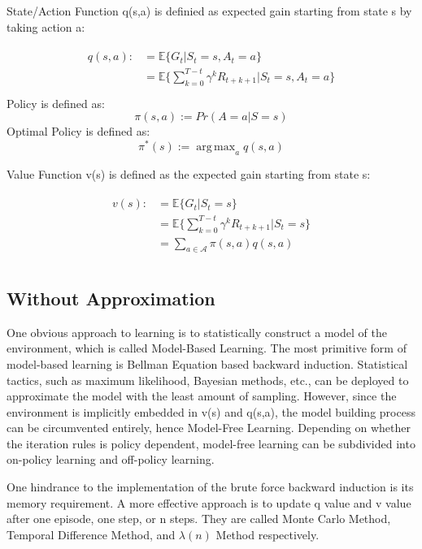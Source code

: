 \documentclass[journal]{IEEEtran}
\DeclareMathOperator*{\argmax}{arg\,max}  %
\begin{document}
State/Action Function q(s,a) is definied as expected gain starting from state s by taking action a:

\begin{align}
\begin{split}
    q(s,a) :&= \mathbb{E}\{G_t|S_t=s,A_t=a\}\\
    &=\mathbb{E} \{\sum_{k=0}^{T-t} \gamma ^k R_{t+k+1}| S_t=s,A_t=a\}\\
\end{split}
\end{align}
Policy is defined as:
\begin{equation}
    \pi(s,a):=Pr(A=a|S=s)
\end{equation}
Optimal Policy is defined as:
\begin{equation}
    \pi^*(s):=\argmax_a q(s,a)
\end{equation}


Value Function v(s) is defined as the expected gain starting from state s:

\begin{align}
\begin{split}
    v(s) :&=  \mathbb{E}\{G_t|S_t=s\}\\
    &=\mathbb{E} \{\sum_{k=0}^{T-t} \gamma ^k R_{t+k+1}| S_t=s\}\\
    &=\sum_{a \in \mathcal{A}} \pi(s,a) q(s,a)\\
\end{split}
\end{align}

\subsection{Without Approximation}
One obvious approach to learning is to statistically construct a model of the environment, which is called Model-Based Learning. The most primitive form of model-based learning is Bellman Equation based backward induction. Statistical tactics, such as maximum likelihood, Bayesian methods, etc., can be deployed to approximate the model with the least amount of sampling. However, since the environment is implicitly embedded in v(s) and q(s,a), the model building process can be circumvented entirely, hence Model-Free Learning. Depending on whether the iteration rules is policy dependent, model-free learning can be subdivided into on-policy learning and off-policy learning.

One hindrance to the implementation of the brute force backward induction is its memory requirement. A more effective approach is to update q value and v value after one episode, one step, or n steps. They are called Monte Carlo Method, Temporal Difference Method, and $\lambda(n)$ Method respectively.
\end{document}
